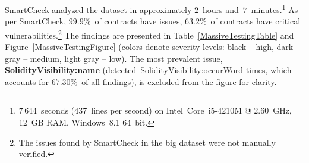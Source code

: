 SmartCheck analyzed the dataset in approximately $2$~hours and~$7$~minutes.\footnote{$7\,644$~seconds ($437$~lines per second) on Intel~Core~i5-4210M @ 2.60~GHz, 12~GB RAM, Windows~8.1 64~bit.}
As per SmartCheck, $99.9\%$~of contracts have issues, $63.2\%$~of contracts have critical vulnerabilities.\footnote{The issues found by SmartCheck in the big dataset were not manually verified.}
The findings are presented in Table~\ref{MassiveTestingTable} and Figure~\ref{MassiveTestingFigure} (colors denote severity levels: black -- high, dark gray -- medium, light gray -- low).
The most prevalent issue, \textbf{\let\letcs\texapiletcs \usevalue SolidityVisibility:name \let\letcs\etoolboxletcs} (detected~{\let\letcs\texapiletcs \usevalue SolidityVisibility:occurWord \let\letcs\etoolboxletcs} times, which accounts for $67.30\%$~of all findings), is excluded from the figure for clarity.

